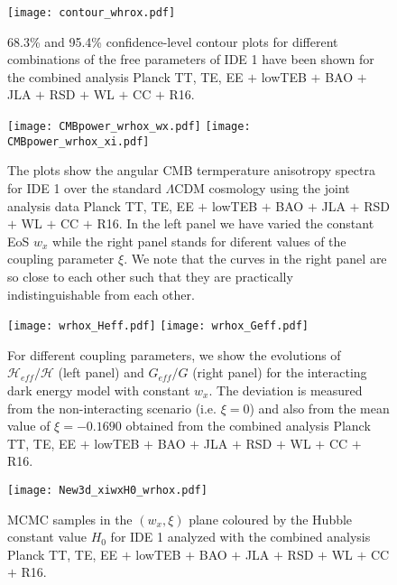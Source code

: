 \documentclass[superscriptaddress,oneolumn,secnumarabic,
amssymb,amsmath,nobibnotes,aps,prd,showpacs,nofootinbib]{revtex4}%
\begin{document}
	\begin{figure}%
		\texttt{[image: contour\_whrox.pdf]}
		\caption{68.3\% and 95.4\% confidence-level contour plots for different combinations of the free parameters of IDE 1 have been shown for the combined analysis Planck TT, TE, EE $+$ lowTEB $+$ BAO $+$ JLA $+$ RSD $+$ WL $+$ CC $+$ R16. }
		\label{fig:contourI}
	\end{figure}

	\begin{figure}%
		\texttt{[image: CMBpower\_wrhox\_wx.pdf]}
		\texttt{[image: CMBpower\_wrhox\_xi.pdf]}
		\caption{The plots show the angular CMB termperature anisotropy spectra for IDE 1 over the standard $\Lambda$CDM cosmology using the joint analysis data Planck TT, TE, EE $+$ lowTEB $+$ BAO $+$ JLA $+$ RSD $+$ WL $+$ CC $+$ R16. In the left panel we have varied the constant EoS $w_x$ while the right panel stands for diferent values of the coupling parameter $\xi$. We note that the curves in the right panel are so close to each other such that they are practically indistinguishable from each other. }
		\label{fig:cmbplotI}
	\end{figure}


	\begin{figure}%
		\texttt{[image: wrhox\_Heff.pdf]}
		\texttt{[image: wrhox\_Geff.pdf]}
		\caption{For different coupling parameters, we show the evolutions of $\mathcal{H}_{eff}/\mathcal{H}$ (left panel) and $G_{eff}/G$ (right panel) for the interacting dark energy model with constant $w_x$. The deviation is measured from the non-interacting scenario (i.e. $\xi =0$) and also from the mean value of $\xi = -0.1690$ obtained from the combined analysis Planck TT, TE, EE $+$ lowTEB $+$ BAO $+$ JLA $+$ RSD $+$ WL $+$ CC $+$ R16. }
		\label{fig:new1-cons}
	\end{figure}


	\begin{figure}%
		\texttt{[image: New3d\_xiwxH0\_wrhox.pdf]}
		\caption{MCMC samples in the $(w_x, \xi)$ plane coloured by the Hubble constant value $H_0$ for IDE 1 analyzed with the combined analysis Planck TT, TE, EE $+$ lowTEB $+$ BAO $+$ JLA $+$ RSD $+$ WL $+$ CC $+$ R16.}
		\label{fig:scatter-IDE1}
	\end{figure}
\end{document}

